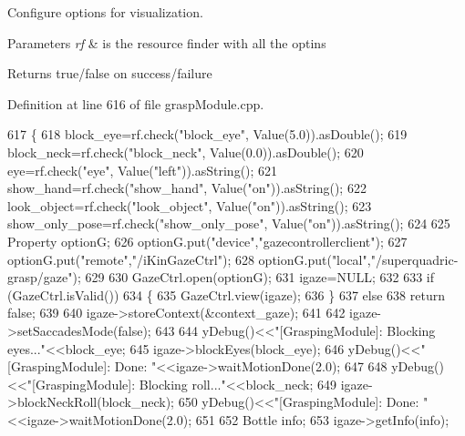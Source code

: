 Configure options for visualization. 


\begin{DoxyParams}{Parameters}
{\em rf} & is the resource finder with all the optins \\
\hline
\end{DoxyParams}
\begin{DoxyReturn}{Returns}
true/false on success/failure 
\end{DoxyReturn}


Definition at line 616 of file grasp\+Module.\+cpp.


\begin{DoxyCode}
617 \{
618     block_eye=rf.check(\textcolor{stringliteral}{"block\_eye"}, Value(5.0)).asDouble();
619     block_neck=rf.check(\textcolor{stringliteral}{"block\_neck"}, Value(0.0)).asDouble();
620     eye=rf.check(\textcolor{stringliteral}{"eye"}, Value(\textcolor{stringliteral}{"left"})).asString();
621     show_hand=rf.check(\textcolor{stringliteral}{"show\_hand"}, Value(\textcolor{stringliteral}{"on"})).asString();
622     look_object=rf.check(\textcolor{stringliteral}{"look\_object"}, Value(\textcolor{stringliteral}{"on"})).asString();
623     show_only_pose=rf.check(\textcolor{stringliteral}{"show\_only\_pose"}, Value(\textcolor{stringliteral}{"on"})).asString();
624 
625     Property optionG;
626     optionG.put(\textcolor{stringliteral}{"device"},\textcolor{stringliteral}{"gazecontrollerclient"});
627     optionG.put(\textcolor{stringliteral}{"remote"},\textcolor{stringliteral}{"/iKinGazeCtrl"});
628     optionG.put(\textcolor{stringliteral}{"local"},\textcolor{stringliteral}{"/superquadric-grasp/gaze"});
629 
630     GazeCtrl.open(optionG);
631     igaze=NULL;
632 
633     \textcolor{keywordflow}{if} (GazeCtrl.isValid())
634     \{
635         GazeCtrl.view(igaze);
636     \}
637     \textcolor{keywordflow}{else}
638         \textcolor{keywordflow}{return} \textcolor{keyword}{false};
639 
640     igaze->storeContext(&context_gaze);
641 
642     igaze->setSaccadesMode(\textcolor{keyword}{false});
643 
644     yDebug()<<\textcolor{stringliteral}{"[GraspingModule]: Blocking eyes..."}<<block_eye;
645     igaze->blockEyes(block_eye);
646     yDebug()<<\textcolor{stringliteral}{"[GraspingModule]: Done: "}<<igaze->waitMotionDone(2.0);
647 
648     yDebug()<<\textcolor{stringliteral}{"[GraspingModule]: Blocking roll..."}<<block_neck;
649     igaze->blockNeckRoll(block_neck);
650     yDebug()<<\textcolor{stringliteral}{"[GraspingModule]: Done: "}<<igaze->waitMotionDone(2.0);
651 
652     Bottle info;
653     igaze->getInfo(info);

\end{DoxyCode}
